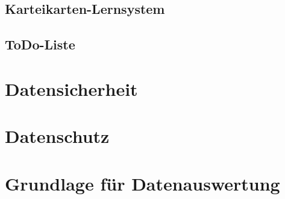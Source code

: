 \subsection{Karteikarten-Lernsystem}
\subsection{ToDo-Liste}
\section{Datensicherheit}
\section{Datenschutz}
\section{Grundlage für Datenauswertung}
